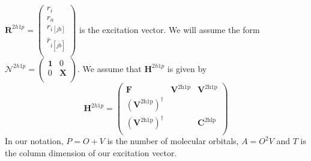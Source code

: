 $\bm{R}^{2h1p}= \begin{pmatrix}
r_i \\ r_a \\ r_{i[jb]} \\ \bar{r}_{i[\bar{jb}]} \\
\end{pmatrix} $ is the excitation vector. We will assume the form $\bm{\mathcal{N}}^{2h1p} = \begin{pmatrix}
\bm{1} & 0 \\
0 & \bm{X} \\
\end{pmatrix}$. We assume that $\bm{H}^{2h1p}$ is given by
\begin{equation}
\bm{H}^{2h1p} = \begin{pmatrix}
\bm{F} & \bm{V}^{2\mathrm{h1p}} & \bm{V}^{2\mathrm{h1p}}  \\
\left(\bm{V}^{2\mathrm{h1p}}\right)^{\dagger} &  &   \\
\left(\bm{V}^{2\mathrm{h1p}}\right)^{\dagger} &  & \bm{C}^{2\mathrm{hlp}} \\
\end{pmatrix}
\end{equation}
In our notation, $P=O+V$ is the number of molecular orbitals, $A=O^2V$ and $T$ is the column dimension of our excitation vector.

